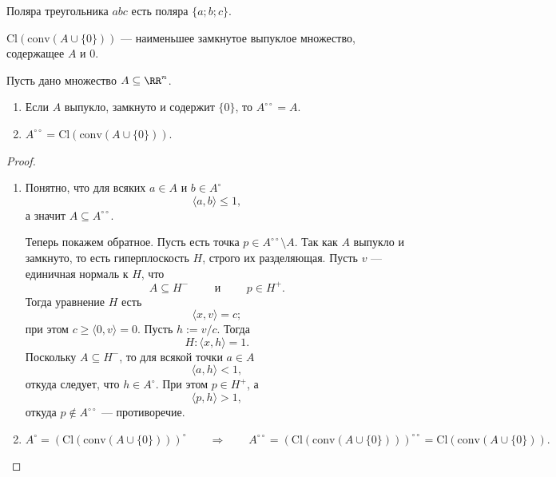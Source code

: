 \documentclass[12pt,a4paper]{article}
\newcommand{\Cl}{\ensuremath{\mathrm{Cl}}\xspace}
\newcommand{\conv}{\ensuremath{\mathrm{conv}}\xspace}
\begin{document}
    \begin{example}
        Поляра треугольника $abc$ есть поляра $\{a; b; c\}$.
    \end{example}

    \begin{remark*}
        $\Cl(\conv(A \cup \{0\}))$ --- наименьшее замкнутое выпуклое множество, содержащее $A$ и $0$.
    \end{remark*}

    \begin{theorem}
        Пусть дано множество $A \subseteq \RR^n$.
        \begin{enumerate}
            \item Если $A$ выпукло, замкнуто и содержит $\{0\}$, то $A^{\circ\circ} = A$.
            \item $A^{\circ\circ} = \Cl(\conv(A \cup \{0\}))$.
        \end{enumerate}
    \end{theorem}

    \begin{proof}\ 
        \begin{enumerate}
            \item Понятно, что для всяких $a \in A$ и $b \in A^\circ$
                \[\langle a, b \rangle \leqslant 1,\]
                а значит $A \subseteq A^{\circ\circ}$.

                Теперь покажем обратное. Пусть есть точка $p \in A^{\circ\circ} \setminus A$. Так как $A$ выпукло и замкнуто, то есть гиперплоскость $H$, строго их разделяющая. Пусть $v$ --- единичная нормаль к $H$, что
                \[A \subseteq H^- \qquad \text{ и } \qquad p \in H^+.\]
                Тогда уравнение $H$ есть
                \[\langle x, v \rangle = c;\]
                при этом $c \geqslant \langle 0, v \rangle = 0$. Пусть $h := v/c$. Тогда
                \[H: \langle x, h \rangle = 1.\]
                Поскольку $A \subseteq H^-$, то для всякой точки $a \in A$
                \[\langle a, h \rangle < 1,\]
                откуда следует, что $h \in A^\circ$. При этом $p \in H^+$, а
                \[\langle p, h \rangle > 1,\]
                откуда $p \notin A^{\circ\circ}$ --- противоречие.
            \item
                \[
                    A^\circ = (\Cl(\conv(A \cup \{0\})))^\circ
                    \qquad \Longrightarrow \qquad
                    A^{\circ\circ} = (\Cl(\conv(A \cup \{0\})))^{\circ\circ} = \Cl(\conv(A \cup \{0\})).
                \]
        \end{enumerate}
    \end{proof}
\end{document}
